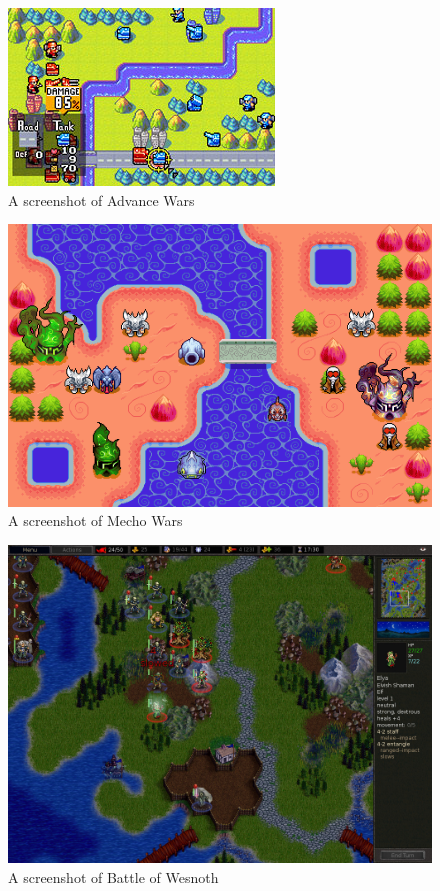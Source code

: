 \documentclass[10pt,a4paper,oneside]{report}
\begin{document}
\begin{figure}[H]
 \caption{A screenshot of Advance Wars}
 \centering
 \includegraphics[keepaspectratio]{advance-wars.jpg}
\end{figure}

\begin{figure}[H]
 \caption{A screenshot of Mecho Wars}
 \centering
\includegraphics[height=\textheight,width=\textwidth,keepaspectratio]{mecho.png}
\end{figure}

\begin{figure}[H]
 \caption{A screenshot of Battle of Wesnoth}
 \centering
\includegraphics[height=\textheight,width=\textwidth,keepaspectratio]{battle-for-wesnoth-screenshot.jpg}
\end{figure}
\end{document}
